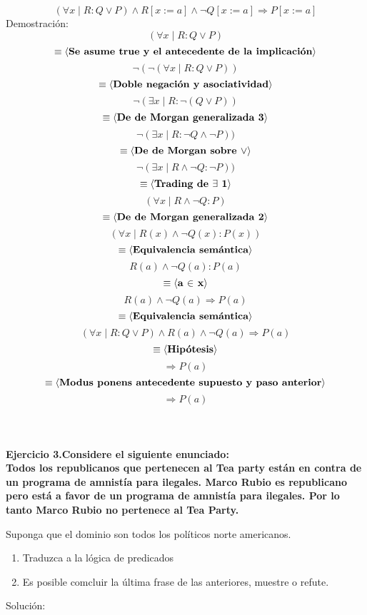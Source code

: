 \documentclass[12pt]{article}
\begin{document}
$$(\forall x \mid R: Q \vee P)\wedge R[x:=a] \wedge \neg Q[x:=a] \Rightarrow
P[x:=a]$$ 
Demostraci\'on:
$$(\forall x \mid R: Q \vee P)$$
$$\equiv  \langle \mbox{\bf{Se asume true y el antecedente de la
implicaci\'on}\rm} \rangle$$ 
$$\neg(\neg (\forall x \mid R: Q \vee P))$$
$$\equiv  \langle \mbox{\bf{Doble negaci\'on y asociatividad}\rm} \rangle$$
$$\neg(\exists x \mid R: \neg (Q \vee P))$$
$$\equiv  \langle \mbox{\bf{De de Morgan generalizada 3}\rm} \rangle$$
$$\neg(\exists x \mid R: \neg Q \wedge \neg P))$$
$$\equiv  \langle \mbox{\bf{De de Morgan sobre $\vee$}\rm} \rangle$$
$$\neg(\exists x \mid R \wedge \neg Q :\neg P))$$
$$\equiv  \langle \mbox{\bf{Trading de $\exists$ 1}\rm} \rangle$$
$$(\forall x \mid R \wedge \neg Q : P)$$
$$\equiv  \langle \mbox{\bf{De de Morgan generalizada 2}\rm} \rangle$$
$$(\forall x \mid R(x) \wedge \neg Q(x) : P(x))$$
$$\equiv  \langle \mbox{\bf{Equivalencia sem\'antica}\rm} \rangle$$
$$R(a) \wedge \neg Q(a) : P(a)$$
$$\equiv  \langle \mbox{\bf{a $\in$ x}\rm} \rangle$$
$$R(a) \wedge \neg Q(a) \Rightarrow P(a)$$
$$\equiv  \langle \mbox{\bf{Equivalencia sem\'antica}\rm} \rangle$$
$$(\forall x \mid R: Q \vee P) \wedge R(a) \wedge \neg Q(a) \Rightarrow P(a) $$
$$\equiv  \langle \mbox{\bf{Hip\'otesis}\rm} \rangle$$
$$\Rightarrow P(a) $$
$$\equiv  \langle \mbox{\bf{Modus ponens antecedente supuesto y paso
anterior}\rm} \rangle$$
$$\Rightarrow P(a) $$
\\
\\
\\

\bf{Ejercicio 3.}\rm Considere el siguiente enunciado:\\
Todos los republicanos que pertenecen al Tea party est\'an en contra de un
programa de amnist\'ia para ilegales. Marco Rubio es republicano pero est\'a a
favor de un programa de amnist\'ia para ilegales. Por lo tanto Marco Rubio no
pertenece al Tea Party.

Suponga que el dominio son todos los pol\'iticos norte americanos.
\begin{enumerate}
  \item Traduzca a la l\'ogica de predicados
  \item Es posible comcluir la \'ultima frase de las anteriores, muestre o
  refute.
\end{enumerate}

Soluci\'on:
\end{document}

